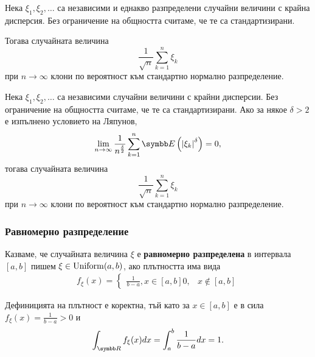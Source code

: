 \documentclass[numbers=endperiod, bibliography=totocnumbered]{scrartcl}
\begin{document}
\begin{theorem}
  Нека \( \xi_1, \xi_2, \ldots \) са независими и еднакво разпределени случайни величини с крайна дисперсия. Без ограничение на общността считаме, че те са стандартизирани.

  Тогава случайната величина
  \begin{equation*}
    \frac 1 {\sqrt n} \sum_{k=1}^n \xi_k
  \end{equation*}
  при \( n \to \infty \) клони по вероятност към стандартно нормално разпределение.
\end{theorem}

\begin{theorem}
  Нека \( \xi_1, \xi_2, \ldots \) са независими случайни величини с крайни дисперсии. Без ограничение на общността считаме, че те са стандартизирани.
  Ако за някое \( \delta > 2 \) е изпълнено условието на Ляпунов,
  \begin{equation*}
    \lim_{n \to \infty} \frac 1 {n^{\frac \delta 2}} \sum_{k=1}^n \Expect \left( {\Abs{\xi_k}}^\delta \right) = 0,
  \end{equation*}
  тогава случайната величина
  \begin{equation*}
    \frac 1 {\sqrt n} \sum_{k=1}^n \xi_k
  \end{equation*}
  при \( n \to \infty \) клони по вероятност към стандартно нормално разпределение.
\end{theorem}

\subsubsection{Равномерно разпределение}\label{dist:unif}

\begin{definition}
  Казваме, че случайната величина \( \xi \) е \textbf{равномерно разпределена} в интервала \( [a, b] \) пишем \( \xi \in \operatorname{Uniform}(a, b) \), ако плътността има вида
  \begin{align*}
    f_\xi(x)
    =
    \begin{cases}
      \frac 1 {b-a}, x \in [a, b]
      0, & x \not\in [a, b]
    \end{cases}
  \end{align*}

  Дефиницията на плътност е коректна, тъй като за \( x \in [a, b] \) е в сила \( f_\xi(x) = \frac 1 {b-a} > 0 \) и
  \begin{equation*}
    \int_{\R} f_\xi(x) dx
    =
    \int_a^b \frac 1 {b-a} dx
    =
    1.
  \end{equation*}
\end{definition}
\end{document}
